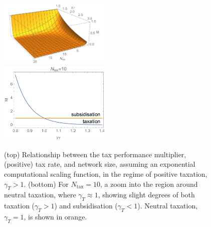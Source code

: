 \pubmode
\begin{figure}[!htbp]
\includegraphics[clip=true, width=0.475\textwidth]{tax_exp}\\
\includegraphics[clip=true, width=0.475\textwidth]{tax_subsidy}
\captionspacefig \caption{(top) Relationship between the tax performance multiplier, (positive) tax rate, and network size, assuming an exponential computational scaling function, in the regime of positive taxation, \mbox{$\gamma_T>1$}. (bottom) For \mbox{$N_\mathrm{tax}=10$}, a zoom into the region around neutral taxation, where \mbox{$\gamma_T\approx 1$}, showing slight degrees of both taxation (\mbox{$\gamma_T>1$}) and subsidisation (\mbox{$\gamma_T<1$}). Neutral taxation, \mbox{$\gamma_T=1$}, is shown in orange.}\label{fig:tax_exp}
\end{figure}
\else
